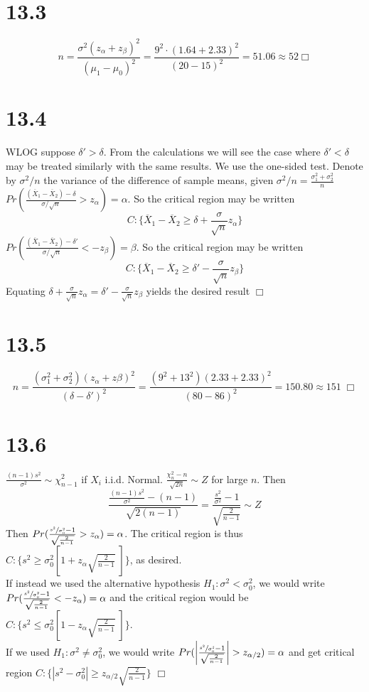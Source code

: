 \documentclass{article}
\begin{document}
\section*{13.3}
$$n = \frac{\sigma^2(z_\alpha+z_\beta)^2}{(\mu_1-\mu_0)^2} = \frac{9^2\cdot(1.64+2.33)^2}{(20-15)^2} = 51.06 \approx 52 \Box$$

\section*{13.4}
WLOG suppose $\delta' > \delta$. From the calculations we will see the case where $\delta' < \delta$ may be treated similarly with the same results. We use the one-sided test. Denote by $\sigma^2/n$ the variance of the difference of sample means, given $\sigma^2/n = \frac{\sigma^2_1 + \sigma^2_2}{n}$\\
$Pr(\frac{(\overline{X}_1-\overline{X}_2) - \delta}{\sigma/\sqrt{n}} > z_\alpha) = \alpha$. So the critical region may be written
$$C : \{\overline{X}_1-\overline{X}_2 \geqslant \delta + \frac{\sigma}{\sqrt{n}}z_\alpha \}$$
$Pr(\frac{(\overline{X}_1-\overline{X}_2) - \delta'}{\sigma/\sqrt{n}} < -z_\beta) = \beta$. So the critical region may be written
$$C : \{\overline{X}_1-\overline{X}_2 \geqslant \delta' - \frac{\sigma}{\sqrt{n}}z_\beta \}$$
Equating $\delta + \frac{\sigma}{\sqrt{n}}z_\alpha = \delta' - \frac{\sigma}{\sqrt{n}}z_\beta$ yields the desired result $\Box$

\section*{13.5}
$$n = \frac{(\sigma^2_1+\sigma^2_2)(z_\alpha+z\beta)^2}{(\delta-\delta')^2} = \frac{(9^2+13^2)(2.33+2.33)^2}{(80-86)^2} = 150.80 \approx 151 \; \Box$$

\section*{13.6}
$\frac{(n-1)s^2}{\sigma^2} \sim \chi^2_{n-1}$ if $X_i$ i.i.d. Normal. $\frac{\chi^2_n - n}{\sqrt{2n}} \sim Z$ for large $n$. Then
$$\frac{\frac{(n-1)s^2}{\sigma^2} - (n-1)}{\sqrt{2(n-1)}} = \frac{\frac{s^2}{\sigma^2}-1}{\sqrt{\frac{2}{n-1}}} \sim Z$$
Then $Pr(\frac{\sfrac{s^2}{\sigma^2_0}-1}{\sqrt{\frac{2}{n-1}}} > z_\alpha) = \alpha$. The critical region is thus $C : \{s^2 \geqslant \sigma^2_0 \left[1+z_\alpha\sqrt{\frac{2}{n-1}}\;\right]\}$, as desired.\\
If instead we used the alternative hypothesis $H_1: \sigma^2 < \sigma_0^2$, we would write $Pr(\frac{\sfrac{s^2}{\sigma^2_0}-1}{\sqrt{\frac{2}{n-1}}} < -z_\alpha) = \alpha$ and the critical region would be $C : \{s^2 \leqslant \sigma^2_0 \left[1-z_\alpha\sqrt{\frac{2}{n-1}}\;\right]\}$.\\
If we used $H_1: \sigma^2 \neq \sigma^2_0$, we would write $Pr(\left\vert\frac{\sfrac{s^2}{\sigma^2_0}-1}{\sqrt{\frac{2}{n-1}}}\right\vert > z_{\alpha/2}) = \alpha$ and get critical region $C : \{|s^2 - \sigma^2_0| \geqslant z_{\alpha/2}\sqrt{\frac{2}{n-1}}\}$ $\Box$
\end{document}
